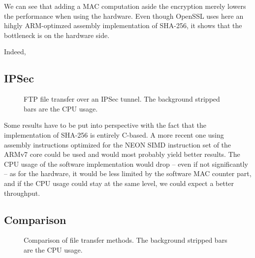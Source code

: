 We can see that adding a MAC computation aside the encryption merely lowers the performance when using the hardware.
Even though OpenSSL uses here an hihgly ARM-optimzed assembly implementation of SHA-256, it shows that the bottleneck is on the hardware side.

Indeed, 

\subsection{IPSec}

\begin{figure}[ht]

\caption{FTP file transfer over an IPSec tunnel. The background stripped bars are the CPU usage.}{}
\label{fig:ipsec-ftp-bench}
\end{figure}

Some results have to be put into perspective with the fact that the implementation of SHA-256 is entirely C-based.
A more recent one using assembly instructions optimized for the NEON SIMD instruction set of the ARMv7 core could be used and would most probably yield better results.
The CPU usage of the software implementation would drop -- even if not significantly -- as for the hardware, it would be less limited by the software MAC counter part, and if the CPU usage could stay at the same level, we could expect a better throughput.

\subsection{Comparison}

\begin{figure}[ht]

\caption{Comparison of file transfer methods. The background stripped bars are the CPU usage.}{}
\label{fig:ftp-bench-comparison}
\end{figure}